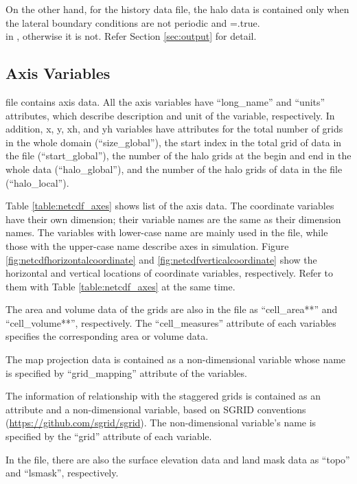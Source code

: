 On the other hand,
for the history data file, 
the halo data is contained 
only when the lateral boundary conditions are not periodic
and =.true. \\
in ,
otherwise it is not. Refer Section \ref{sec:output} for detail.


\subsection{Axis Variables}
\scalenetcdf file contains axis data.
All the axis variables have 
``long\_name'' and ``units'' attributes,
which describe description and unit of the variable, respectively.
In addition, x, y, xh, and yh variables 
have attributes for the total number of grids in the whole domain (``size\_global''),
the start index in the total grid of data in the file (``start\_global''),
the number of the halo grids at the begin and end in the whole data (``halo\_global''),
and the number of the halo grids of data in the file (``halo\_local'').

Table \ref{table:netcdf_axes} shows list of the axis data.
The coordinate variables have their own dimension; their variable names are the same as their dimension names.
The variables with lower-case name are mainly used in the file, 
while those with the upper-case name describe axes in simulation.
Figure \ref{fig:netcdfhorizontalcoordinate} and \ref{fig:netcdfverticalcoordinate} show 
the horizontal and vertical locations of coordinate variables,
respectively.
Refer to them with Table \ref{table:netcdf_axes} at the same time.

The area and volume data of the grids are also in the file as ``cell\_area**'' and ``cell\_volume**'', respectively.
The ``cell\_measures'' attribute of each variables specifies the corresponding area or volume data.

The map projection data is contained as a non-dimensional variable whose name is specified by ``grid\_mapping'' attribute of the variables.

The information of relationship with the staggered grids is contained as an attribute and a non-dimensional variable, based on SGRID conventions (\url{https://github.com/sgrid/sgrid}).
The non-dimensional variable's name is specified by the ``grid'' attribute of each variable.

In the file, there are also the surface elevation data and land mask data as ``topo'' and ``lsmask'', respectively.



